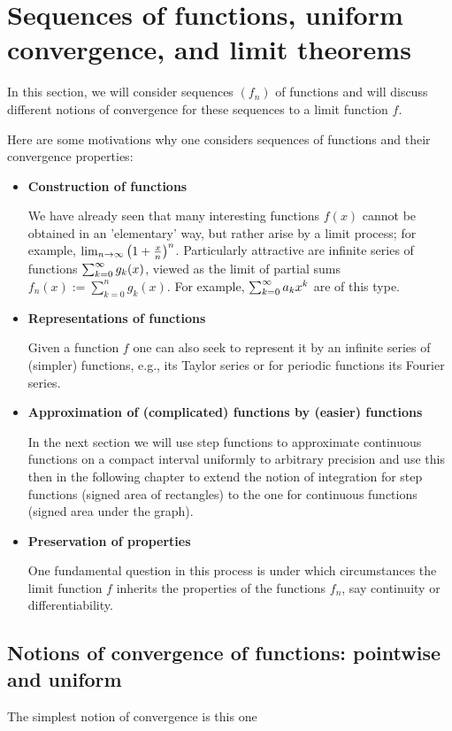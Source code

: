 \documentclass[10pt, a4paper]{article}
\newcommand{\infsumo}{\infsum[k = 0]}
\begin{document}
\section{Sequences of functions, uniform convergence, and limit theorems}

In this section,
we will consider sequences $(f_n)$ of functions and will discuss different notions of convergence for these sequences to a limit function $f$.

Here are some motivations why one considers sequences of functions and their convergence properties:
\begin{itemize}
    \item \textbf{Construction of functions}

    We have already seen that many interesting functions $f(x)$ cannot be obtained in an 'elementary' way,
    but rather arise by a limit process;
    for example,
    $\lim_{n \rightarrow \infty}\left(1 + \frac{x}{n}\right) ^ n$.
    Particularly attractive are infinite series of functions $\infsumo g_k(x)$,
    viewed as the limit of partial sums $f_n(x) := \sum_{k = 0}^{n}g_k(x)$.
    For example,
    $\infsumo a_kx ^ k$ are of this type.

    \item \textbf{Representations of functions}

    Given a function $f$ one can also seek to represent it by an infinite series of
    (simpler)
    functions,
    e.g.,
    its Taylor series or for periodic functions its Fourier series.

    \item \textbf{Approximation of (complicated) functions by (easier) functions}

    In the next section we will use step functions to approximate continuous functions on a compact interval uniformly to arbitrary precision and use this then in the following chapter to extend the notion of integration for step functions
    (signed area of rectangles)
    to the one for continuous functions
    (signed area under the graph).

    \item \textbf{Preservation of properties}

    One fundamental question in this process is under which circumstances the limit function $f$ inherits the properties of the functions $f_n$,
    say continuity or differentiability.
\end{itemize}

\subsection{Notions of convergence of functions: pointwise and uniform}
The simplest notion of convergence is this one
\end{document}
